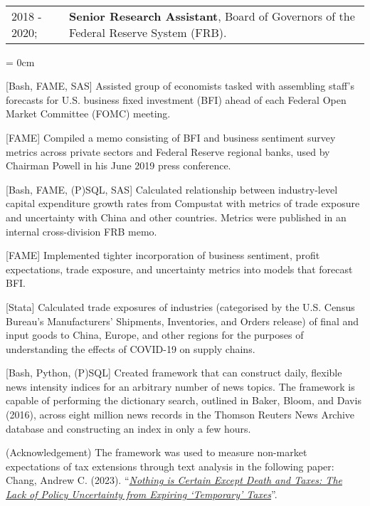 \documentclass[a4paper, 10pt]{article}
\begin{document}
  ~\begin{tabular}{ll}
    2018 - 2020; & \textbf{Senior Research Assistant}, Board of Governors of the Federal Reserve System (FRB).
  \end{tabular}
  \begin{compactitem}\parskip = 0cm
    \item {[Bash, FAME, SAS]} Assisted group of economists tasked with assembling staff's forecasts for U.S. business fixed investment (BFI) ahead of each Federal Open Market Committee (FOMC) meeting.
    \item {[FAME]} Compiled a memo consisting of BFI and business sentiment survey metrics across private sectors and Federal Reserve regional banks, used by Chairman Powell in his June 2019 press conference.
    \item {[Bash, FAME, (P)SQL, SAS]} Calculated relationship between industry-level capital expenditure growth rates from Compustat with metrics of trade exposure and uncertainty with China and other countries. Metrics were published in an internal cross-division FRB memo.
    \item {[FAME]} Implemented tighter incorporation of business sentiment, profit expectations, trade exposure, and uncertainty metrics into models that forecast BFI.
    \item {[Stata]} Calculated trade exposures of industries (categorised by the U.S. Census Bureau's Manufacturers' Shipments, Inventories, and Orders release) of final and input goods to China, Europe, and other regions for the purposes of understanding the effects of COVID-19 on supply chains.
    \item {[Bash, Python, (P)SQL]} Created framework that can construct daily, flexible news intensity indices for an arbitrary number of news topics. The framework is capable of performing the dictionary search, outlined in Baker, Bloom, and Davis (2016), across eight million news records in the Thomson Reuters News Archive database and constructing an index in only a few hours.
    \begin{compactitem}
      \item {(Acknowledgement)} The framework was used to measure non-market expectations of tax extensions through text analysis in the following paper: Chang, Andrew C. (2023). ``\href{https://drive.google.com/file/d/1ipHYM7oGXl9A5VQJqe9VwLM4ZMVJYsC9/view}{\textit{Nothing is Certain Except Death and Taxes: The Lack of Policy Uncertainty from Expiring `Temporary' Taxes}}''.
    \end{compactitem}

\end{compactitem}
\end{document}
